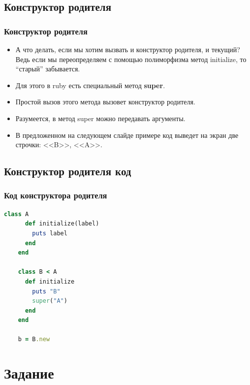 \documentclass[compress,red]{beamer}
\begin{document}
\subsection{Конструктор родителя}
\begin{frame}[fragile]
  \frametitle{Конструктор родителя}
  \begin{itemize}
    \item А что делать, если мы хотим вызвать и конструктор родителя, и текущий? Ведь если мы переопределяем с помощью полиморфизма метод initialize, то ``старый'' забывается.
    \item Для этого в ruby есть специальный метод \textbf{super}.
    \item Простой вызов этого метода вызовет конструктор родителя.
    \item Разумеется, в метод super можно передавать аргументы.
    \item В предложенном на следующем слайде примере код выведет на экран две строчки: <<B>>, <<A>>.
  \end{itemize}
  
\end{frame}

\subsection{Конструктор родителя код}
\begin{frame}[fragile]
  \frametitle{Код конструктора родителя}
  \scriptsize{
  \begin{lstlisting}[language=ruby,basicstyle=\footnotesize,label=ruby9,caption=Конструктор родителя]
    class A
      def initialize(label)
        puts label
      end
    end
    
    class B < A
      def initialize
        puts "B"
        super("A")
      end
    end
    
    b = B.new
  \end{lstlisting}
  }
\end{frame}

\section{Задание}
\end{document}

